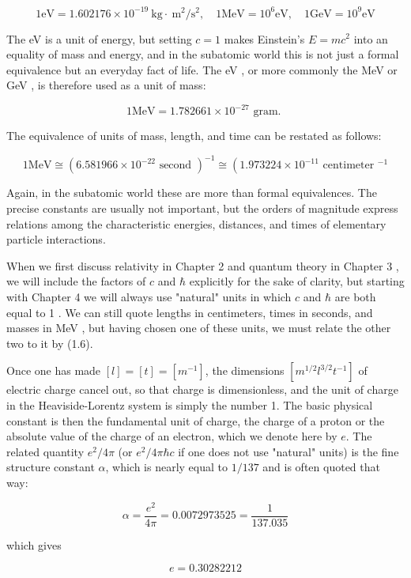 \documentclass[10pt, letterpaper]{article}
\begin{document}
$$
1 \mathrm{eV}=1.602176 \times 10^{-19} \mathrm{~kg} \cdot \mathrm{~m}^{2} / \mathrm{s}^{2}, \quad 1 \mathrm{MeV}=10^{6} \mathrm{eV}, \quad 1 \mathrm{GeV}=10^{9} \mathrm{eV}
$$

The eV is a unit of energy, but setting $c=1$ makes Einstein's $E=m c^{2}$ into an equality of mass and energy, and in the subatomic world this is not just a formal equivalence but an everyday fact of life. The eV , or more commonly the MeV or GeV , is therefore used as a unit of mass:

$$
1 \mathrm{MeV}=1.782661 \times 10^{-27} \text { gram. }
$$

The equivalence of units of mass, length, and time can be restated as follows:

$$
1 \mathrm{MeV} \cong\left(6.581966 \times 10^{-22} \text { second }\right)^{-1} \cong\left(1.973224 \times 10^{-11} \text { centimeter }^{-1}\right.
$$

Again, in the subatomic world these are more than formal equivalences. The precise constants are usually not important, but the orders of magnitude express relations among the characteristic energies, distances, and times of elementary particle interactions.

When we first discuss relativity in Chapter 2 and quantum theory in Chapter 3 , we will include the factors of $c$ and $\hbar$ explicitly for the sake of clarity, but starting with Chapter 4 we will always use "natural" units in which $c$ and $\hbar$ are both equal to 1 . We can still quote lengths in centimeters, times in seconds, and masses in MeV , but having chosen one of these units, we must relate the other two to it by (1.6).

Once one has made $[l]=[t]=\left[m^{-1}\right]$, the dimensions $\left[m^{1 / 2} l^{3 / 2} t^{-1}\right]$ of electric charge cancel out, so that charge is dimensionless, and the unit of charge in the Heaviside-Lorentz system is simply the number 1. The basic physical constant is then the fundamental unit of charge, the charge of a proton or the absolute value of the charge of an electron, which we denote here by $e$. The related quantity $e^{2} / 4 \pi$ (or $e^{2} / 4 \pi \hbar c$ if one does not use "natural" units) is the fine structure constant $\alpha$, which is nearly equal to $1 / 137$ and is often quoted that way:

$$
\alpha=\frac{e^{2}}{4 \pi}=0.0072973525=\frac{1}{137.035}
$$

which gives

$$
e=0.30282212
$$
\end{document}
